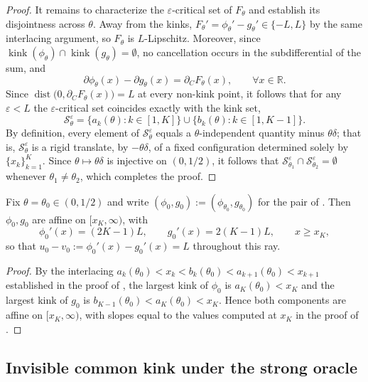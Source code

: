 \begin{proof}
It remains to characterize the $\varepsilon$-critical set of $F_\theta$
and establish its disjointness across $\theta$. Away from the kinks,
$F_\theta'=\phi_\theta'-g_\theta'\in\{-L,L\}$ by the same interlacing
argument, so $F_\theta$ is $L$-Lipschitz. Moreover, since
$\operatorname{kink}(\phi_\theta)\cap\operatorname{kink}(g_\theta)=\emptyset$,
no cancellation occurs in the subdifferential of the sum, and
\[
    \partial\phi_\theta(x)-\partial g_\theta(x)=\partial_C F_\theta(x),
    \qquad\forall x\in\mathbb R .
\]
Since $\operatorname{dist}\bigl(0,\partial_C F_\theta(x)\bigr)=L$ at every
non-kink point, it follows that for any $\varepsilon<L$ the
$\varepsilon$-critical set coincides exactly with the kink set,
\[
    \mathcal S_\theta^\varepsilon
    =
    \{a_k(\theta):k\in[1,K]\}
    \cup
    \{b_k(\theta):k\in[1,K-1]\} .
\]
By definition, every element of $\mathcal S_\theta^\varepsilon$ equals a
$\theta$-independent quantity minus $\theta\delta$; that is,
$\mathcal S_\theta^\varepsilon$ is a rigid translate, by $-\theta\delta$, of
a fixed configuration determined solely by $\{x_k\}_{k=1}^K$. Since
$\theta\mapsto\theta\delta$ is injective on $(0,1/2)$, it follows that
$\mathcal S_{\theta_1}^\varepsilon\cap\mathcal S_{\theta_2}^\varepsilon
=\emptyset$ whenever $\theta_1\neq\theta_2$, which completes the proof.
\end{proof}

\begin{corollary}
\label{cor:affine-tail}
Fix $\theta=\theta_0\in(0,1/2)$ and write $(\phi_0,g_0):=(\phi_{\theta_0},g_{\theta_0})$ for the pair of . Then $\phi_0,g_0$ are affine on $[x_K,\infty)$, with
\[
    \phi_0'(x)=(2K-1)L,
    \qquad
    g_0'(x)=2(K-1)L,
    \qquad
    x\ge x_K,
\]
so that $u_0-v_0:=\phi_0'(x)-g_0'(x)=L$ throughout this ray.
\end{corollary}

\begin{proof}
By the interlacing $a_k(\theta_0)<x_k<b_k(\theta_0)<a_{k+1}(\theta_0)<x_{k+1}$
established in the proof of , the largest kink
of $\phi_0$ is $a_K(\theta_0)<x_K$ and the largest kink of $g_0$ is
$b_{K-1}(\theta_0)<a_K(\theta_0)<x_K$. Hence both components are affine on
$[x_K,\infty)$, with slopes equal to the values computed at $x_K$ in the
proof of .
\end{proof}

\subsection{Invisible common kink under the strong oracle}
\label{subsec:common-kink}


